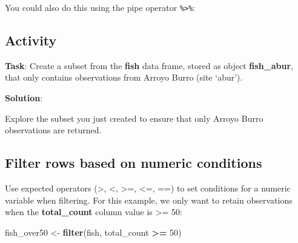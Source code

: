 \documentclass[]{book}
\newenvironment{Shaded}{\begin{snugshade}}{\end{snugshade}}
\newcommand{\DecValTok}[1]{\textcolor[rgb]{0.00,0.00,0.81}{#1}}
\newcommand{\KeywordTok}[1]{\textcolor[rgb]{0.13,0.29,0.53}{\textbf{#1}}}
\newcommand{\NormalTok}[1]{#1}
\newcommand{\OperatorTok}[1]{\textcolor[rgb]{0.81,0.36,0.00}{\textbf{#1}}}
\newcommand{\StringTok}[1]{\textcolor[rgb]{0.31,0.60,0.02}{#1}}
\begin{document}
You could also do this using the pipe operator \texttt{\%\textgreater{}\%}:

\begin{Shaded}
\end{Shaded}

\hypertarget{activity-4}{%
\subsection{Activity}\label{activity-4}}

\textbf{Task}: Create a subset from the \textbf{fish} data frame, stored as object \textbf{fish\_abur}, that only contains observations from Arroyo Burro (site `abur').

\textbf{Solution}:

\begin{Shaded}
\end{Shaded}

Explore the subset you just created to ensure that only Arroyo Burro observations are returned.

\hypertarget{filter-rows-based-on-numeric-conditions}{%
\subsection{Filter rows based on numeric conditions}\label{filter-rows-based-on-numeric-conditions}}

Use expected operators (\textgreater{}, \textless{}, \textgreater{}=, \textless{}=, ==) to set conditions for a numeric variable when filtering. For this example, we only want to retain observations when the \textbf{total\_count} column value is \textgreater{}= 50:

\begin{Shaded}
\begin{Highlighting}[]
\NormalTok{fish_over50 <-}\StringTok{ }\KeywordTok{filter}\NormalTok{(fish, total_count }\OperatorTok{>=}\StringTok{ }\DecValTok{50}\NormalTok{)}
\end{Highlighting}
\end{Shaded}
\end{document}
